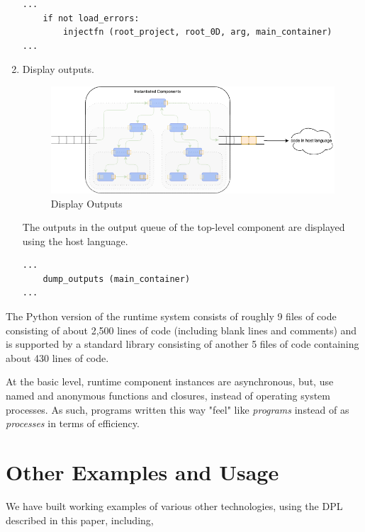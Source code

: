 \documentclass[10pt,anonymous,review]{acmart}
\begin{document}
\begin{enumerate}
\begin{verbatim}
...
    if not load_errors:
        injectfn (root_project, root_0D, arg, main_container)
...
\end{verbatim}
  
\item Display outputs.
  \begin{figure}[h]
    \centering
    \includegraphics[width=0.8\linewidth]{./media/image7.png}
    \caption{Display Outputs}
    \label{fig:display}
  \end{figure}

The outputs in the output queue of the top-level component are displayed
using the host language.

\begin{verbatim}
...
    dump_outputs (main_container)
...
\end{verbatim}
  
\end{enumerate}

The Python version of the runtime system consists of roughly 9 files of
code consisting of about 2,500 lines of code (including blank lines and
comments) and is supported by a standard library consisting of another 5
files of code containing about 430 lines of code.

At the basic level, runtime component instances are asynchronous, but,
use named and anonymous functions and closures, instead of operating
system processes. As such, programs written this way "feel" like
\emph{programs} instead of as \emph{processes} in terms of efficiency.

\section{Other Examples and Usage}
We have built working examples of various other technologies, using the
DPL described in this paper, including,
\end{document}

